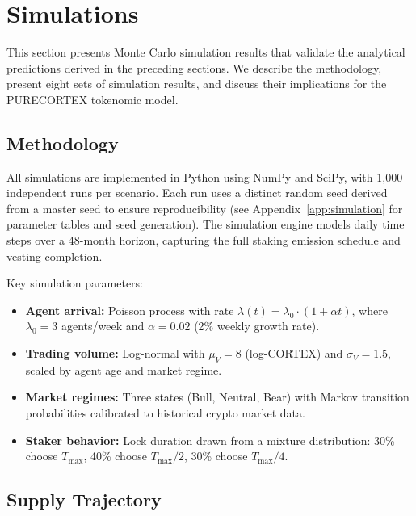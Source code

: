 \section{Simulations}
\label{sec:simulations}

This section presents Monte Carlo simulation results that validate the
analytical predictions derived in the preceding sections. We describe the
methodology, present eight sets of simulation results, and discuss their
implications for the PURECORTEX tokenomic model.

\subsection{Methodology}
\label{subsec:sim-methodology}

All simulations are implemented in Python using NumPy and SciPy, with 1{,}000
independent runs per scenario. Each run uses a distinct random seed derived
from a master seed to ensure reproducibility (see
Appendix~\ref{app:simulation} for parameter tables and seed generation). The
simulation engine models daily time steps over a 48-month horizon, capturing
the full staking emission schedule and vesting completion.

Key simulation parameters:
\begin{itemize}
  \item \textbf{Agent arrival:} Poisson process with rate
    $\lambda(t) = \lambda_0 \cdot (1 + \alpha t)$, where $\lambda_0 = 3$
    agents/week and $\alpha = 0.02$ (2\% weekly growth rate).
  \item \textbf{Trading volume:} Log-normal with
    $\mu_V = 8$ (log-CORTEX) and $\sigma_V = 1.5$, scaled by agent age
    and market regime.
  \item \textbf{Market regimes:} Three states (Bull, Neutral, Bear) with
    Markov transition probabilities calibrated to historical crypto market
    data.
  \item \textbf{Staker behavior:} Lock duration drawn from a mixture
    distribution: 30\% choose $T_{\max}$, 40\% choose $T_{\max}/2$, 30\%
    choose $T_{\max}/4$.
\end{itemize}

\subsection{Supply Trajectory}
\label{subsec:sim-supply}

